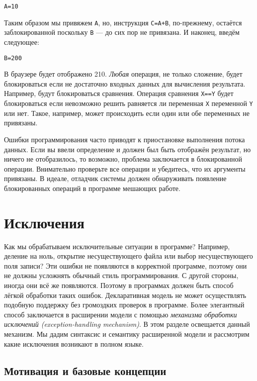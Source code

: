 \begin{lstlisting}
A=10
\end{lstlisting}

Таким образом мы привяжем \lstinline|A|, но, инструкция \lstinline|C=A+B|, по-прежнему, остаётся заблокированной поскольку \lstinline|B| --- до сих пор не привязана. И наконец, введём следующее:

\begin{lstlisting}
B=200
\end{lstlisting}

В браузере будет отображено 210. \emph{Любая} операция, не только сложение, будет блокироваться если не достаточно входных данных для вычисления результата. Например, будут блокироваться сравнения. Операция сравнения \lstinline|X==Y| будет блокироваться если невозможно решить равняется ли переменная \lstinline|X| переменной \lstinline|Y| или нет. Такое, например, может происходить если один или обе переменных не привязаны.

Ошибки программирования часто приводят к приостановке выполнения потока данных. Если вы ввели определение и должен был быть отображён результат, но ничего не отобразилось, то возможно, проблема заключается в блокированной операции. Внимательно проверьте все операции и убедитесь, что их аргументы привязаны. В идеале, отладчик системы должен обнаруживать появление блокированных операций в программе мешающих работе.

\section{Исключения}

Как мы обрабатываем исключительные ситуации в программе? Например, деление на ноль, открытие несуществующего файла или выбор несуществующего поля записи? Эти ошибки не появляются в корректной программе, поэтому они не должны усложнять обычный стиль программирования. С другой стороны, иногда они всё же появляются. Поэтому в программах должен быть способ лёгкой обработки таких ошибок. Декларативная модель не может осуществлять подобную поддержку без громоздких проверок в программе. Более элегантный способ заключается в расширении модели с помощью \emph{механизма обработки исключений (exception-handling mechanism)}. В этом разделе освещается данный механизм. Мы дадим синтаксис и семантику расширенной модели и рассмотрим какие исключения возникают в полном языке.

\subsection{Мотивация и базовые концепции}

